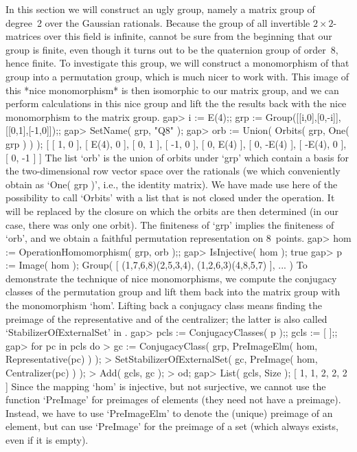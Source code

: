 
In this section we will construct an ugly group, namely a matrix group of
degree~2 over the Gaussian rationals. Because the group of all invertible
$2\times  2$-matrices over this field is  infinite, {\GAP} cannot be sure
from the beginning that our group is finite,  even though it turns out to
be the quaternion  group of  order~8, hence  finite. To  investigate this
group, we will construct a monomorphism of that  group into a permutation
group, which  is much  nicer   to work with. This    image of this  *nice
monomorphism* is then isomorphic to our matrix  group, and we can perform
calculations in  this nice group  and lift the the  results back with the
nice monomorphism to the matrix group.
\beginexample
    gap> i := E(4);; grp := Group([[i,0],[0,-i]],[[0,1],[-1,0]]);;
    gap> SetName( grp, "Q8" );
    gap> orb := Union( Orbits( grp, One( grp ) ) );
    [ [ 1, 0 ], [ E(4), 0 ], [ 0, 1 ], [ -1, 0 ], [ 0, E(4) ], [ 0, -E(4) ], 
        [ -E(4), 0 ], [ 0, -1 ] ]
\endexample
The list `orb' is  the union of orbits under  `grp' which contain a basis
for the  two-dimensional row vector   space over the rationals (we  which
conveniently obtain as `One( grp )', i.e., the  identity matrix). We have
made use here of the possibility to call `Orbits' with a list that is not
closed under the operation.  It will be  replaced by the closure on which
the orbits are then determined  (in our case, there  was only one orbit).
The finiteness of `grp' implies the finiteness  of `orb', and we obtain a
faithful permutation representation on 8~points.
\beginexample
    gap> hom := OperationHomomorphism( grp, orb );;
    gap> IsInjective( hom );
    true
    gap> p := Image( hom );
    Group( [ (1,7,6,8)(2,5,3,4), (1,2,6,3)(4,8,5,7) ], ... )
\endexample
To   demonstrate  the technique of  nice    monomorphisms, we compute the
conjugacy classes of  the permutation group and  lift them back  into the
matrix group with the monomorphism `hom'.  Lifting back a conjugacy class
means finding the preimage of  the representative and of the centralizer;
the latter is also called `StabilizerOfExternalSet' in {\GAP}.
\beginexample
    gap> pcls := ConjugacyClasses( p );; gcls := [  ];;
    gap> for pc  in pcls  do
    >      gc := ConjugacyClass( grp, PreImageElm( hom, Representative(pc) ) );
    >      SetStabilizerOfExternalSet( gc, PreImage( hom, Centralizer(pc) ) );
    >      Add( gcls, gc );
    >    od;
    gap> List( gcls, Size );
    [ 1, 1, 2, 2, 2 ]
\endexample
Since the  mapping `hom' is injective, but  not surjective, we cannot use
the function `PreImage' for  preimages of elements  (they need not have a
preimage). Instead,  we have to use `PreImageElm'  to denote the (unique)
preimage of an element, but can use `PreImage'  for the preimage of a set
(which always exists, even if it is empty).

